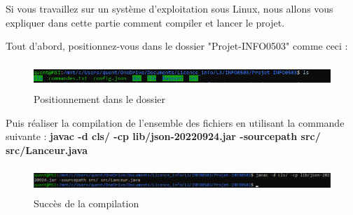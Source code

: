 Si vous travaillez sur un système d'exploitation sous Linux, nous allons vous expliquer dans cette partie comment compiler et lancer le projet.

Tout d'abord, positionnez-vous dans le dossier "Projet-INFO0503" comme ceci : 

\begin{figure}[h]
    \centering
    \includegraphics[width= 170mm, height=10mm]{images/positionnement.png}
    \caption{Positionnement dans le dossier}
    \label{img:mesh1}
\end{figure}

Puis réaliser la compilation de l'ensemble des fichiers en utilisant la commande suivante : \newline
\textbf{javac -d cls/ -cp lib/json-20220924.jar -sourcepath src/ src/Lanceur.java}

\begin{figure}[h]
    \centering
    \includegraphics[width= 170mm, height=10mm]{images/compilation.png}
    \caption{Succès de la compilation}
    \label{img:mesh2}
\end{figure}


